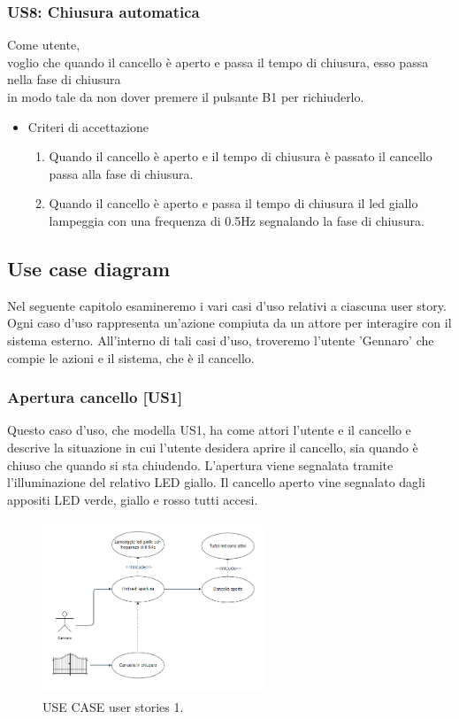 \documentclass[12pt]{article}
\begin{document}
\subsubsection{US8: Chiusura automatica}
Come utente, \\
voglio che quando il cancello è aperto e passa il tempo di chiusura, esso passa nella fase di chiusura\\
in modo tale da non dover premere il pulsante B1 per richiuderlo.
\begin{itemize}
    \item Criteri di accettazione
    \begin{enumerate}
        \item Quando il cancello è aperto e il tempo di chiusura è passato il cancello passa alla fase di chiusura.
        \item Quando il cancello è aperto e passa il tempo di chiusura il led giallo lampeggia con una frequenza di 0.5Hz segnalando la fase di chiusura.
    \end{enumerate}
\end{itemize}

\newpage



\subsection{Use case diagram}
Nel seguente capitolo esamineremo i vari casi d'uso relativi a ciascuna user story. Ogni caso d'uso rappresenta un'azione compiuta da un attore per interagire con il sistema esterno. All'interno di tali casi d'uso, troveremo l'utente 'Gennaro' che compie le azioni e il sistema, che è il cancello.

\subsubsection{Apertura cancello [US1]}
Questo caso d'uso, che modella US1, ha come attori l'utente e il cancello e descrive la situazione in cui l'utente desidera aprire il cancello, sia quando è chiuso che quando si sta chiudendo. L'apertura viene segnalata tramite l'illuminazione del relativo LED giallo. Il cancello aperto vine segnalato dagli appositi LED verde, giallo e rosso tutti accesi.
    \begin{figure}[h]
        \centering
        \includegraphics[width=0.6\textwidth,height=5.2cm]{use_case_us1.PNG}
        \caption{USE CASE user stories 1.}
        \label{fig:use_case_us1}
    \end{figure}
\end{document}
